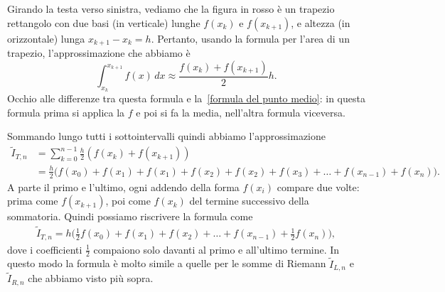 \documentclass[a4paper]{report}
\theoremstyle{definiton}
\theoremstyle{remark}
\newcommand{\x}{\mathbf{x}}
\begin{document}
\begin{center}
    \end{center}
Girando la testa verso sinistra, vediamo che la figura in rosso è un trapezio rettangolo con due basi (in verticale) lunghe $f(x_k)$ e $f(x_{k+1})$, e altezza (in orizzontale) lunga $x_{k+1}-x_k = h$. Pertanto, usando la formula per l'area di un trapezio, l'approssimazione che abbiamo è
\begin{equation} \label{trapezi semplice}
    \int_{x_k}^{x_{k+1}} f(x)\, dx \approx \frac{f(x_k)+f(x_{k+1})}{2}h.
\end{equation}
Occhio alle differenze tra questa formula e la~\eqref{formula del punto medio}: in questa formula prima si applica la $f$ e poi si fa la media, nell'altra formula viceversa.

Sommando lungo tutti i sottointervalli quindi abbiamo l'approssimazione
\begin{align*}
    \tilde{I}_{T,n} &= \sum_{k=0}^{n-1 }\frac{h}{2}(f(x_k)+f(x_{k+1}))\\
    &= \frac{h}{2}\biggl(f(x_0)+f(x_1) + f(x_1)+f(x_2) + f(x_2)+f(x_3) + \dots + f(x_{n-1})+f(x_n)\biggr).    
\end{align*}
A parte il primo e l'ultimo, ogni addendo della forma $f(x_i)$ compare due volte: prima come $f(x_{k+1})$, poi come $f(x_k)$ del termine successivo della sommatoria. Quindi possiamo riscrivere la formula come
\begin{align*}
    \tilde{I}_{T,n} = h\biggl(\frac{1}{2} f(x_0) + f(x_1) + f(x_2) + \dots + f(x_{n-1}) + \frac{1}{2}f(x_n)  \biggr),
\end{align*}
dove i coefficienti $\frac{1}{2}$ compaiono solo davanti al primo e all'ultimo termine. In questo modo la formula è molto simile a quelle per le somme di Riemann $\tilde{I}_{L,n}$ e $\tilde{I}_{R,n}$ che abbiamo visto più sopra.
\end{document}
